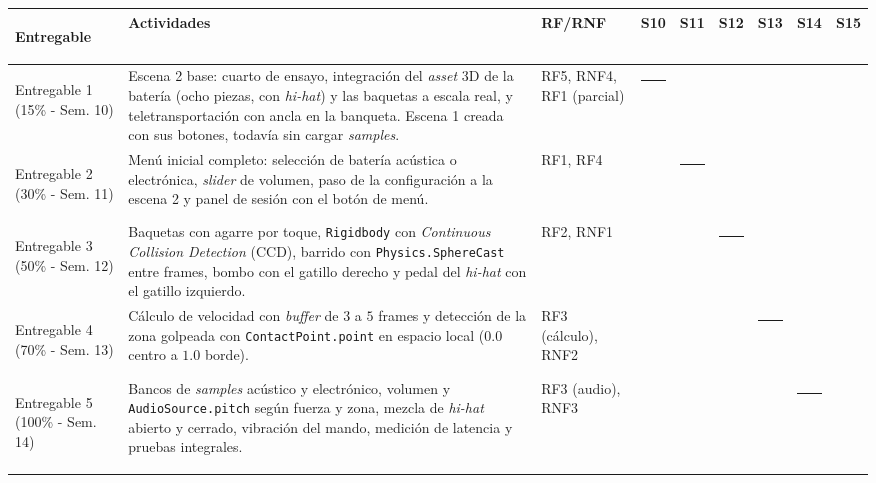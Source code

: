 \documentclass{article}
\begin{document}
\begin{table}[H]
\centering
\small
\setlength{\tabcolsep}{4pt}
\renewcommand{\arraystretch}{1.45}
\begin{tabular}{@{} >{\bfseries\raggedright\arraybackslash}p{} >{\raggedright\arraybackslash}p{} >{\raggedright\arraybackslash}p{} c c c c c c @{}}
\toprule
Entregable & \textbf{Actividades} & \textbf{RF/RNF} & \textbf{S10} & \textbf{S11} & \textbf{S12} & \textbf{S13} & \textbf{S14} & \textbf{S15} \\
\midrule
Entregable 1 \newline \normalfont\footnotesize(15\% - Sem. 10) &
Escena 2 base: cuarto de ensayo, integración del \textit{asset} 3D de la batería (ocho piezas, con \textit{hi-hat}) y las baquetas a escala real, y teletransportación con ancla en la banqueta. Escena 1 creada con sus botones, todavía sin cargar \textit{samples}. &
RF5, RNF4, RF1 (parcial) &
\rule{0.45cm}{0.28cm} & & & & & \\
\addlinespace[0.3em]

Entregable 2 \newline \normalfont\footnotesize(30\% - Sem. 11) &
Menú inicial completo: selección de batería acústica o electrónica, \textit{slider} de volumen, paso de la configuración a la escena 2 y panel de sesión con el botón de menú. &
RF1, RF4 &
& \rule{0.45cm}{0.28cm} & & & & \\
\addlinespace[0.3em]

Entregable 3 \newline \normalfont\footnotesize(50\% - Sem. 12) &
Baquetas con agarre por toque, \texttt{Rigidbody} con \textit{Continuous Collision Detection} (CCD), barrido con \texttt{Physics.SphereCast} entre frames, bombo con el gatillo derecho y pedal del \textit{hi-hat} con el gatillo izquierdo. &
RF2, RNF1 &
& & \rule{0.45cm}{0.28cm} & & & \\
\addlinespace[0.3em]

Entregable 4 \newline \normalfont\footnotesize(70\% - Sem. 13) &
Cálculo de velocidad con \textit{buffer} de $3$ a $5$ frames y detección de la zona golpeada con \texttt{ContactPoint.point} en espacio local ($0.0$ centro a $1.0$ borde). &
RF3 (cálculo), RNF2 &
& & & \rule{0.45cm}{0.28cm} & & \\
\addlinespace[0.3em]

Entregable 5 \newline \normalfont\footnotesize(100\% - Sem. 14) &
Bancos de \textit{samples} acústico y electrónico, volumen y \texttt{AudioSource.pitch} según fuerza y zona, mezcla de \textit{hi-hat} abierto y cerrado, vibración del mando, medición de latencia y pruebas integrales. &
RF3 (audio), RNF3 &
& & & & \rule{0.45cm}{0.28cm} & \\
\addlinespace[0.3em]


\end{tabular}
\end{table}
\end{document}
